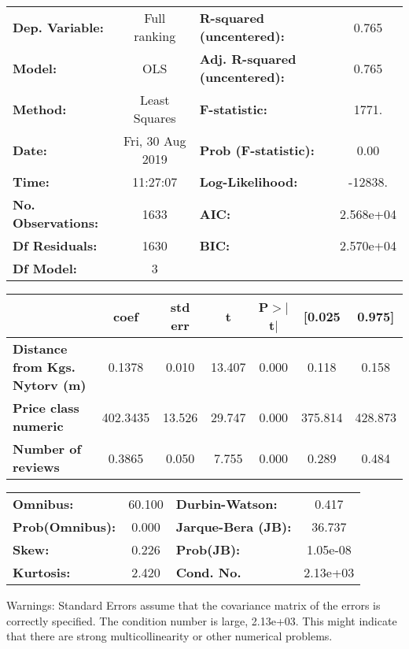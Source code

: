 \documentclass{report}
\begin{document}
\begin{center}
\begin{tabular}{lclc}
\toprule
\textbf{Dep. Variable:}                &   Full ranking   & \textbf{  R-squared (uncentered):}      &     0.765   \\
\textbf{Model:}                        &       OLS        & \textbf{  Adj. R-squared (uncentered):} &     0.765   \\
\textbf{Method:}                       &  Least Squares   & \textbf{  F-statistic:       }          &     1771.   \\
\textbf{Date:}                         & Fri, 30 Aug 2019 & \textbf{  Prob (F-statistic):}          &     0.00    \\
\textbf{Time:}                         &     11:27:07     & \textbf{  Log-Likelihood:    }          &   -12838.   \\
\textbf{No. Observations:}             &        1633      & \textbf{  AIC:               }          & 2.568e+04   \\
\textbf{Df Residuals:}                 &        1630      & \textbf{  BIC:               }          & 2.570e+04   \\
\textbf{Df Model:}                     &           3      & \textbf{                     }          &             \\
\bottomrule
\end{tabular}
\begin{tabular}{lcccccc}
                                       & \textbf{coef} & \textbf{std err} & \textbf{t} & \textbf{P$> |$t$|$} & \textbf{[0.025} & \textbf{0.975]}  \\
\midrule
\textbf{Distance from Kgs. Nytorv (m)} &       0.1378  &        0.010     &    13.407  &         0.000        &        0.118    &        0.158     \\
\textbf{Price class numeric}           &     402.3435  &       13.526     &    29.747  &         0.000        &      375.814    &      428.873     \\
\textbf{Number of reviews}             &       0.3865  &        0.050     &     7.755  &         0.000        &        0.289    &        0.484     \\
\bottomrule
\end{tabular}
\begin{tabular}{lclc}
\textbf{Omnibus:}       & 60.100 & \textbf{  Durbin-Watson:     } &    0.417  \\
\textbf{Prob(Omnibus):} &  0.000 & \textbf{  Jarque-Bera (JB):  } &   36.737  \\
\textbf{Skew:}          &  0.226 & \textbf{  Prob(JB):          } & 1.05e-08  \\
\textbf{Kurtosis:}      &  2.420 & \textbf{  Cond. No.          } & 2.13e+03  \\
\bottomrule
\end{tabular}
\end{center}

Warnings: \newline
 [1] Standard Errors assume that the covariance matrix of the errors is correctly specified. \newline
 [2] The condition number is large, 2.13e+03. This might indicate that there are \newline
 strong multicollinearity or other numerical problems.
\end{document}
